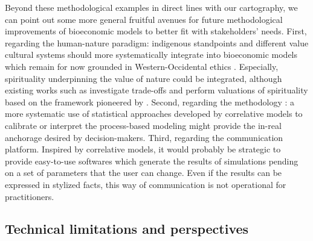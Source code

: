 Beyond these methodological examples in direct lines with our cartography, we can point out some more general fruitful avenues for future methodological improvements of bioeconomic models to better fit with stakeholders' needs. First, regarding the human-nature paradigm: indigenous standpoints and different value cultural systems should more systematically integrate into bioeconomic models which remain for now grounded in Western-Occidental ethics \citep{Kneese1985}. 
Especially, spirituality underpinning the value of nature could be integrated, although existing works such as \cite{Lopes2020} investigate trade-offs and perform valuations of spirituality based on the framework pioneered by \cite{Krutilla1967}. Second, regarding the methodology : a more systematic use of statistical approaches developed by correlative models to calibrate or interpret the process-based modeling might provide the in-real anchorage desired by decision-makers. Third, regarding the communication platform. Inspired by correlative models, it would probably be strategic to provide easy-to-use softwares which generate the results of simulations pending on a set of parameters that the user can change. Even if the results can be expressed in stylized facts, this way of communication is not operational for practitioners.






\subsection{Technical limitations and perspectives}

